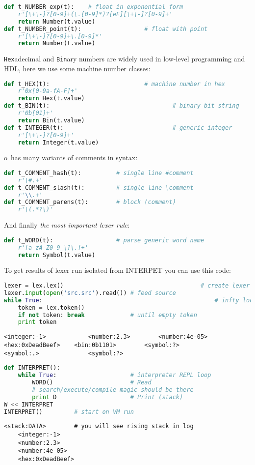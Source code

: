 \medskip
\begin{lstlisting}[language=Python]
def t_NUMBER_exp(t):	# float in exponential form
	r'[\+\-]?[0-9]+(\.[0-9]*)?[eE][\+\-]?[0-9]+'
	return Number(t.value)
def t_NUMBER_point(t):					# float with point
	r'[\+\-]?[0-9]+\.[0-9]*'
	return Number(t.value)
\end{lstlisting}
\clearpage
\noindent \verb|Hex|adecimal and \verb|Bin|ary numbers are widely used in
low-level programming and HDL, here we use some machine number classes:
\begin{lstlisting}[language=Python]
def t_HEX(t):							# machine number in hex
    r'0x[0-9a-fA-F]+'
    return Hex(t.value)
def t_BIN(t):									# binary bit string
    r'0b[01]+'
    return Bin(t.value)
def t_INTEGER(t):								# generic integer
    r'[\+\-]?[0-9]+'
    return Integer(t.value)
\end{lstlisting}
\clearpage\noindent o\F\ has many variants of comments in syntax:
\begin{lstlisting}[language=Python]
def t_COMMENT_hash(t):			# single line #comment
	r'\#.+'
def t_COMMENT_slash(t):			# single line \comment
	r'\\.+'
def t_COMMENT_parens(t):		# block (comment)
	r'\(.*?\)'
\end{lstlisting}

\bigskip\noindent And finally \emph{the most important lexer rule}:
\begin{lstlisting}[language=Python]
def t_WORD(t): 					# parse generic word name
    r'[a-zA-Z0-9_\?\.]+'
    return Symbol(t.value)
\end{lstlisting}
\clearpage\noindent To get results of lexer run isolated from INTERPET you can
use this code:

\begin{lstlisting}[language=Python]
lexer = lex.lex()										# create lexer
lexer.input(open('src.src').read())	# feed source
while True:													# infty loop
    token = lex.token()
    if not token: break				# until empty token
    print token
\end{lstlisting}
\begin{lstlisting}
<integer:-1>			<number:2.3>		<number:4e-05>
<hex:0xDeadBeef>	<bin:0b1101>		<symbol:?>	
<symbol:.>				<symbol:?>
\end{lstlisting}



\clearpage\noindent
\begin{lstlisting}[language=Python]
def INTERPRET():
    while True:						# interpreter REPL loop
        WORD()						# Read
		# search/execute/compile magic should be there
        print D						# Print (stack)
W << INTERPRET
INTERPRET()			# start on VM run
\end{lstlisting}
\begin{lstlisting}
<stack:DATA>		# you will see rising stack in log
	<integer:-1>
	<number:2.3>
	<number:4e-05>
	<hex:0xDeadBeef>
\end{lstlisting}
\clearpage\noindent


